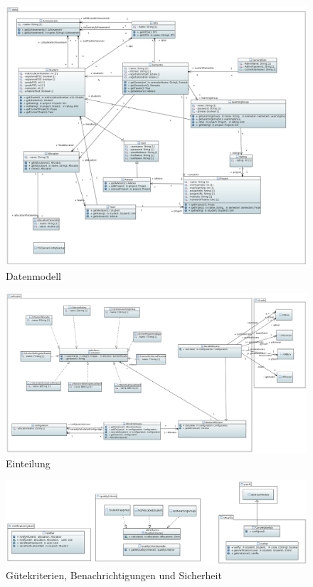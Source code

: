 \documentclass[parskip=full]{scrartcl}
\begin{document}
\begin{figure}[!htb]
\centering
\includegraphics[width=\linewidth]{bilder/daten.png}
\caption{Datenmodell}
\label{uml:data}
\end{figure}

\begin{figure}
\centering
\includegraphics[width=\linewidth]{bilder/einteilung.png}
\caption{Einteilung}
\label{uml:allocation}
\end{figure}

\begin{figure}
\centering
\includegraphics[width=\linewidth]{bilder/notifyGueteSecurity.png}
\caption{Gütekriterien, Benachrichtigungen und Sicherheit}
\label{uml:qualityCriteria}
\end{figure}
\end{document}

